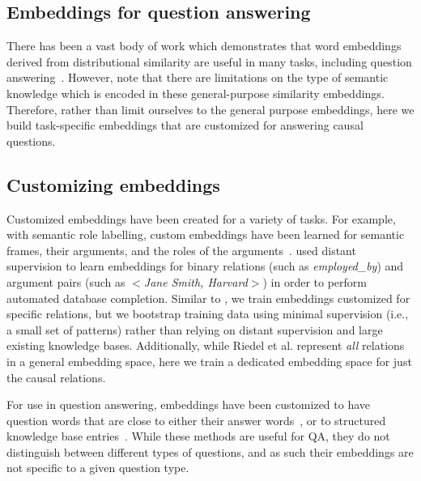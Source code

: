 \subsection{Embeddings for question answering}
There has been a vast body of work which demonstrates that word embeddings derived from distributional similarity are useful in many tasks, including question answering~\mbox{\citep[see \emph{inter alia}][]{fried2015higher,yih13}}.  However, \citet{levy2015supervised} note that there are limitations on the type of semantic knowledge which is encoded in these general-purpose similarity embeddings.  Therefore, rather than limit ourselves to the general purpose embeddings, here we build task-specific embeddings that are customized for answering causal questions.

\subsection{Customizing embeddings}
Customized embeddings have been created for a variety of tasks. %
For example, with semantic role labelling, custom embeddings have been learned for semantic frames, their arguments, and the roles of the arguments~\citep[e.g.,][]{fitzgerald2015semantic,woodsenddistributed}.  \citet{riedel2013relation} used distant supervision to learn embeddings for binary relations (such as \textit{employed\_by}) and argument pairs (such as $<$\textit{Jane Smith, Harvard}$>$) in order to perform automated database completion.  
Similar to \citeauthor{riedel2013relation}, we train embeddings customized for specific relations, but we bootstrap training data using minimal supervision (i.e., a small set of patterns) rather than relying on distant supervision and large existing knowledge bases.  Additionally, while Riedel et al. represent \textit{all} relations in a general embedding space, here we train a dedicated embedding space for just the causal relations. 

For use in question answering, embeddings have been customized to have question words that are close to either their answer words~\citep{bordes2014question}, or to structured knowledge base entries~\citep{yang2014joint}.  While these methods are useful for QA, they do not distinguish between different types of questions, and as such their embeddings are not specific to a given question type.

